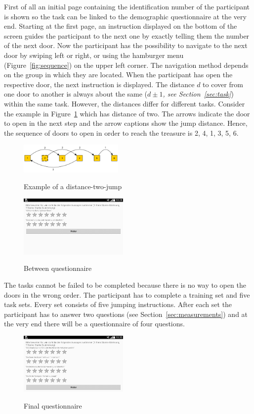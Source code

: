 \documentclass{sig-alternate-05-2015}
\begin{document}
First of all an initial page containing the identification number of the participant is shown so the task can be linked to the demographic questionnaire at the very end. Starting at the first page, an instruction displayed on the bottom of the screen guides the participant to the next one by exactly telling them the number of the next door. Now the participant has the possibility to navigate to the next door by swiping left or right, or using the hamburger menu (Figure~\ref{fig:sequence}) on the upper left corner. The navigation method depends on the group in which they are located. When the participant has open the respective door, the next instruction is displayed. The distance $d$ to cover from one door to another is always about the same ($d \pm 1$\textit{, see Section~\ref{sec:task}}) within the same task. However, the distances differ for different tasks. Consider the example in Figure~\ref{fig:jump} which has distance of two. The arrows indicate the door to open in the next step and the arrow captions show the jump distance. Hence, the sequence of doors to open in order to reach the treasure is 2, 4, 1, 3, 5, 6.
\begin{figure}
	\centering
	\includegraphics[width=0.45\textwidth]{pics/jump}\label{fig:jump}
	\caption{Example of a distance-two-jump}
\end{figure}
\begin{figure}
	\centering
	\includegraphics[width=0.475\textwidth]{pics/screenshots/global3-cut}\label{fig:between_questionnaire}
	\caption{Between questionnaire}
\end{figure}
The tasks cannot be failed to be completed because there is no way to open the doors in the wrong order. The participant has to complete a training set and five task sets. Every set consists of five jumping instructions. After each set the participant has to answer two questions (see Section~\ref{sec:measurements}) and at the very end there will be a questionnaire of four questions.
\begin{figure}
	\centering
	\includegraphics[width=0.475\textwidth]{pics/screenshots/global5-cut}\label{fig:final_questionnaire}
	\caption{Final questionnaire}
\end{figure}
\end{document}
